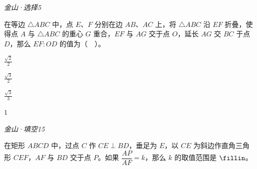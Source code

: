 \documentclass{exam-zh}
\begin{document}
\newpage


\begin{question}[points=4]
    \hfill{\color{edu-blue!60}\small\textit{金山·选择5}}\par
    在等边 $\triangle ABC$ 中，点 $E$、$F$ 分别在边 $AB$、$AC$ 上，将 $\triangle ABC$ 沿 $EF$ 折叠，使得点 $A$ 与 $\triangle ABC$ 的重心 $G$ 重合，$EF$ 与 $AG$ 交于点 $O$，延长 $AG$ 交 $BC$ 于点 $D$，那么 $EF:OD$ 的值为（　）。
    \par
    \begin{choices}[columns=1]
      \item $\frac{\sqrt2}{2}$
      \item $\frac{\sqrt3}{2}$
      \item $\frac{\sqrt3}{3}$
      \item $1$
    \end{choices}
  \par\medskip
  \answerarea[40mm]
\end{question}


\begin{question}[points=4]
    \hfill{\color{edu-blue!60}\small\textit{金山·填空15}}\par
    在矩形 $ABCD$ 中，过点 $C$ 作 $CE\perp BD$，垂足为 $E$，以 $CE$ 为斜边作直角三角形 $CEF$，$AF$ 与 $BD$ 交于点 $P$。如果 $\dfrac{AP}{AF}=k$，那么 $k$ 的取值范围是 $\fillin$。
  \par\medskip
  \answerarea[48mm]
\end{question}

\newpage

\end{document}
